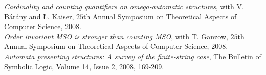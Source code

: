\documentclass[a4paper]{article}
\begin{document}
{\it Cardinality and counting quantifiers on omega-automatic structures}, with V.  B{\'a}r{\'a}ny and \L. Kaiser, 
$25$th Annual Symposium on Theoretical Aspects of Computer Science, $2008$.  \\

{\it Order invariant MSO is stronger than counting MSO}, with T. Ganzow, 
$25$th Annual Symposium on Theoretical Aspects of Computer Science, $2008$.  \\

{\it Automata presenting structures: A survey of the finite-string case}, The Bulletin of Symbolic Logic, 
Volume 14, Issue 2, 2008, 169-209.\\
%

%
%
% 
%
%
%

\iffalse

{\it Finite Automata and Algebraic Structures},
with Bakhadyr Khoussainov, 
Abstracts of Symposium on Logic and Applications, Novosibirsk, May $2000$. \\

{\it On Automata Presentable Structures},
with Bakhadyr Khoussainov, 
Abstracts of papers presented to the American Mathematical Society, 
$20(2), 1999$. \\ 
\fi

\end{document}
